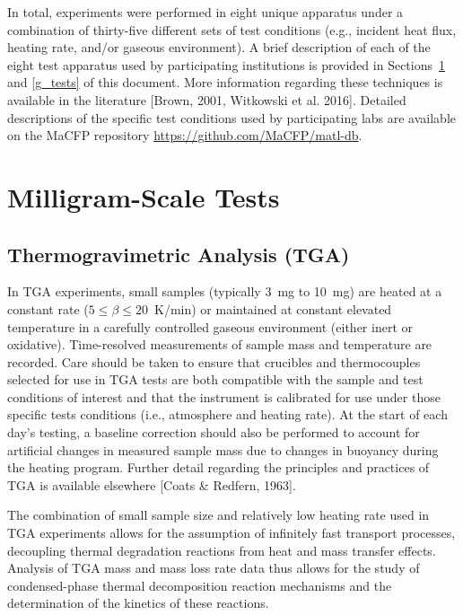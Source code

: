 \documentclass{book}
\begin{document}
In total, experiments were performed in eight unique apparatus under a combination of thirty-five different sets of test conditions (e.g., incident heat flux, heating rate, and/or gaseous environment). A brief description of each of the eight test apparatus used by participating institutions is provided in Sections~\ref{mg_tests} and \ref{g_tests} of this document. More information regarding these techniques is available in the literature [Brown, 2001, Witkowski et al. 2016]. Detailed descriptions of the specific test conditions used by participating labs are available on the MaCFP repository \href{https://github.com/MaCFP/matl-db}{https://github.com/MaCFP/matl-db}.


\section{Milligram-Scale Tests}
\label{mg_tests}

\subsection{Thermogravimetric Analysis (TGA)}

In TGA experiments, small samples (typically 3~mg to 10~mg) are heated at a constant rate ($5\le\beta\le20$~K/min) or maintained at constant elevated temperature in a carefully controlled gaseous environment (either inert or oxidative). Time-resolved measurements of sample mass and temperature are recorded. Care should be taken to ensure that crucibles and thermocouples selected for use in TGA tests are both compatible with the sample and test conditions of interest and that the instrument is calibrated for use under those specific tests conditions (i.e., atmosphere and heating rate). At the start of each day’s testing, a baseline correction should also be performed to account for artificial changes in measured sample mass due to changes in buoyancy during the heating program. Further detail regarding the principles and practices of TGA is available elsewhere [Coats \& Redfern, 1963].

The combination of small sample size and relatively low heating rate used in TGA experiments allows for the assumption of infinitely fast transport processes, decoupling thermal degradation reactions from heat and mass transfer effects. Analysis of TGA mass and mass loss rate data thus allows for the study of condensed-phase thermal decomposition reaction mechanisms and the determination of the kinetics of these reactions.
\end{document}

